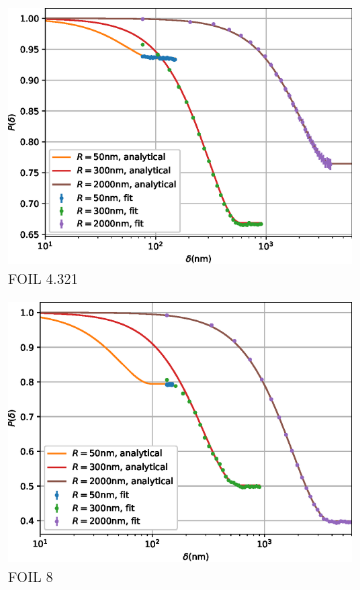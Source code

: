 \documentclass{article}
\begin{document}
\begin{figure}[p]
	\centering
	\begin{subfigure}[b]{0.45\textwidth}
		\centering
		\includegraphics[width=\textwidth]{simulation-plot-FOIL-4.321}
		\caption{FOIL 4.321}
		\label{fig:simulation-plot-FOIL-4.321}
	\end{subfigure}
	\hfill
	\begin{subfigure}[b]{0.45\textwidth}
		\centering
		\includegraphics[width=\textwidth]{simulation-plot-FOIL-8}
		\caption{FOIL 8}
		\label{fig:simulation-plot-FOIL-8}
	\end{subfigure}
	\centering
	\begin{subfigure}[b]{0.45\textwidth}
		\centering

\end{subfigure}
\end{figure}
\end{document}
